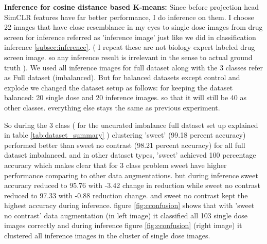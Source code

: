 \textbf{Inference for cosine distance based K-means:}
Since before projection head SimCLR features have far better performance, I do  inference on them. I choose 22 images that have close resemblance in my eyes to single dose images from drug screen for inference referred as 'inference image' just like we did in classification inference \ref{subsec:inference}. ( I repeat these are not biology expert labeled drug screen image. so any inference result is irrelevant in the sense to actual ground truth ). We used all inference images for full dataset along with the 3 classes refer as Full dataset (imbalanced). But for balanced datasets except control and explode
 we changed the  dataset setup as follows: for keeping the dataset balanced: 20 single dose and 20 inference images. so that it will still be 40 as other classes. everything else stays the same as previous experiment.

So during the 3 class ( for the uncurated imbalance full dataset set up explained in table \ref{tab:dataset_summary} ) clustering 'sweet' (99.18 percent accuracy) performed better than sweet no contrast (98.21 percent accuracy) for all full dataset imbalanced. and in other dataset types, 'sweet' achieved 100 percentage accuracy which makes clear that for 3 class problem sweet have higher performance comparing to other data augmentations. but during inference sweet accuracy reduced to 95.76  with -3.42 change in reduction while sweet no contrast reduced to  97.33 with -0.88 reduction change. and sweet no contrast kept the highest accuracy during inference. figure \ref{fig:cconfusion} shows that with 'sweet no contrast' data augmentation (in left image) it classified all 103 single dose images correctly and during inference figure \ref{fig:cconfusion} (right image) it clustered all inference images in the cluster of single dose images.

\begin{table}[H]
    \centering
    \caption{Inference evaluation results on cosine distance based K-means}
    \label{tab:professional_table}
\end{table}

